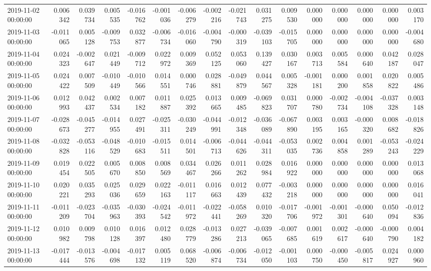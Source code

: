 \begin{tabular}{lrrrrrrrrrrrrrrr}
2019-11-02 00:00:00 & 0.006342 & 0.039734 & 0.005535 & -0.016762 & -0.001036 & -0.006279 & -0.002216 & -0.021743 & 0.031275 & 0.009530 & 0.000000 & 0.000000 & 0.000000 & 0.000000 & 0.003170 \\
2019-11-03 00:00:00 & -0.011065 & 0.005128 & -0.009753 & 0.032877 & -0.006734 & -0.016060 & -0.004790 & -0.000319 & -0.039103 & -0.015705 & 0.000000 & 0.000000 & 0.000000 & 0.000000 & -0.004680 \\
2019-11-04 00:00:00 & 0.024323 & -0.002647 & 0.021449 & -0.009712 & 0.022972 & 0.009369 & 0.052125 & 0.053060 & 0.139427 & 0.030167 & 0.003713 & 0.005584 & 0.000640 & 0.042187 & 0.028047 \\
2019-11-05 00:00:00 & 0.024422 & 0.007509 & -0.010449 & -0.010566 & 0.014551 & 0.000746 & 0.028881 & -0.049879 & 0.044567 & 0.005328 & -0.001181 & 0.000200 & 0.001858 & 0.020822 & 0.005486 \\
2019-11-06 00:00:00 & 0.012993 & 0.042437 & 0.002534 & 0.007182 & 0.011887 & 0.025392 & 0.013665 & 0.009485 & -0.069823 & 0.031707 & 0.000780 & -0.002734 & -0.004108 & -0.037328 & 0.003148 \\
2019-11-07 00:00:00 & -0.028673 & -0.045277 & -0.014955 & 0.027491 & -0.025311 & -0.030249 & -0.044991 & -0.012348 & -0.036089 & -0.067890 & 0.003195 & 0.003165 & -0.000320 & 0.008682 & -0.018826 \\
2019-11-08 00:00:00 & -0.032828 & -0.053116 & -0.048529 & -0.010683 & -0.015511 & 0.014501 & -0.006713 & -0.044626 & -0.044311 & -0.053035 & 0.002736 & 0.004858 & 0.001289 & -0.053243 & -0.024229 \\
2019-11-09 00:00:00 & 0.019454 & 0.022505 & 0.005670 & 0.008850 & 0.008569 & 0.034467 & 0.026266 & 0.011262 & 0.028984 & 0.016922 & 0.000000 & 0.000000 & 0.000000 & 0.000000 & 0.013068 \\
2019-11-10 00:00:00 & 0.020221 & 0.035293 & 0.025036 & 0.029659 & 0.022163 & -0.011117 & 0.016663 & 0.012439 & 0.077432 & -0.003218 & 0.000000 & 0.000000 & 0.000000 & 0.000000 & 0.016041 \\
2019-11-11 00:00:00 & -0.011209 & -0.023704 & -0.035963 & -0.030393 & -0.024542 & -0.011972 & -0.022441 & -0.058269 & 0.010320 & -0.017706 & -0.001972 & -0.001301 & -0.000640 & 0.050094 & -0.012836 \\
2019-11-12 00:00:00 & 0.010982 & 0.009798 & 0.010128 & 0.016397 & 0.012480 & 0.028779 & -0.013286 & 0.027213 & -0.039065 & -0.007685 & 0.001619 & 0.002617 & -0.000640 & -0.000790 & 0.004182 \\
2019-11-13 00:00:00 & -0.017444 & -0.013576 & -0.004698 & -0.017132 & 0.005119 & 0.068520 & -0.006874 & -0.006734 & -0.012050 & -0.001103 & 0.000750 & -0.000450 & -0.005817 & 0.024927 & 0.000960 \\

\end{tabular}
